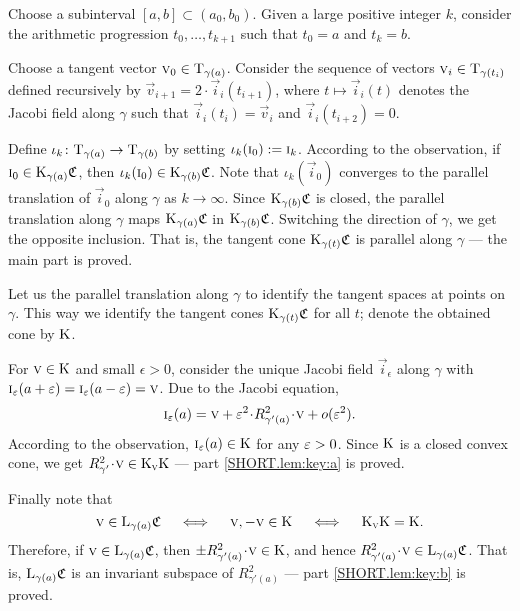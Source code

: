 \documentclass[a4paper,10pt]{article}
\begin{document}
Choose a subinterval $[a,b] \subset (a_0,b_0)$.
Given a large positive integer $k$, consider the arithmetic progression
$t_0,\dots,t_{k+1}$ such that $t_0=a$ and $t_k=b$.

Choose a tangent vector $\text{\sc{v}}_0\in\mathrm{T}_{\gamma(a)}$.
Consider the sequence of vectors $\vec{v}_i\z\in\T_{\gamma(t_i)}$ defined recursively by $\vec{v}_{i+1}=2\cdot \vec{i}_i(t_{i+1})$, where $t\mapsto \vec{i}_i(t)$ denotes the Jacobi field along $\gamma$ such that $\vec{i}_i(t_i)=\vec{v}_i$ and $\vec{i}_i(t_{i+2})=0$.

Define $\iota_k\colon\mathrm{T}_{\gamma(a)}\to \mathrm{T}_{\gamma(b)}$ by setting $\iota_k(\text{\sc{i}}_0)\mathrel{{:}{=}} \text{\sc{i}}_k$.
According to the observation, if $\text{\sc{i}}_0\in \mathrm{K}_{\gamma(a)}\mathfrak{C}$, then $\iota_k(\text{\sc{i}}_0)\in \mathrm{K}_{\gamma(b)}\mathfrak{C}$.
Note that $\iota_k(\vec{i}_0)$ converges to the parallel translation of $\vec{i}_0$ along $\gamma$ as $k\to \infty$.
Since $\mathrm{K}_{\gamma(b)}\mathfrak{C}$ is closed,
the parallel translation along $\gamma$ maps $\mathrm{K}_{\gamma(a)}\mathfrak{C}$ in $\mathrm{K}_{\gamma(b)}\mathfrak{C}$.
Switching the direction of $\gamma$, we get the opposite inclusion.
That is, the tangent cone $\mathrm{K}_{\gamma(t)}\mathfrak{C}$ is parallel along $\gamma$ --- the main part is proved.

Let us the parallel translation along $\gamma$ to identify the tangent spaces at points on $\gamma$.
This way we identify the tangent cones $\mathrm{K}_{\gamma(t)}\mathfrak{C}$ for all $t$;
denote the obtained cone by $\mathrm{K}$.

For $\text{\sc{v}}\in \mathrm{K}$ and small $\epsilon>0$, consider the unique Jacobi field $\vec{i}_\epsilon$ along $\gamma$ with $\vec{i}_\epsilon (a+\eps)\z=\vec{i} _\epsilon(a-\eps)=\vec{v}$.
Due to the Jacobi equation,
\[\vec{i}_\epsilon (a)=\vec{v} +\eps^2\cdot R^2_{\gamma'(a)}\cdot \vec{v} +o(\eps^2).\]
According to the observation, $\text{\sc{i}}_\varepsilon(a)\in \mathrm{K}$ for any $\varepsilon>0$.
Since $\mathrm{K}$ is a closed convex cone, we get $R^2_{\gamma'}\cdot \vec{v}\z\in \K_\vec{v}\K$ --- part \ref{SHORT.lem:key:a} is proved.

Finally note that 
\[\text{\sc{v}}\in \mathrm{L}_{\gamma(a)}\mathfrak{C}
\quad\iff\quad 
\text{\sc{v}}, -\text{\sc{v}}\in \mathrm{K}
\quad\iff\quad 
\mathrm{K}_{\text{\sc{v}}}\mathrm{K}=\mathrm{K}.
\]
Therefore, if $\text{\sc{v}}\in \mathrm{L}_{\gamma(a)}\mathfrak{C}$, then $\pm R^2_{\gamma'(a)}\cdot \vec{v}\in \K$, and hence $R^2_{\gamma'(a)}\cdot \vec{v}\in \L_{\gamma(a)}\mathfrak{C}$.
That is, $\mathrm{L}_{\gamma(a)}\mathfrak{C}$ is an invariant subspace of $R^2_{\gamma'(a)}$ --- part \ref{SHORT.lem:key:b} is proved.
\qeds
\end{document}
